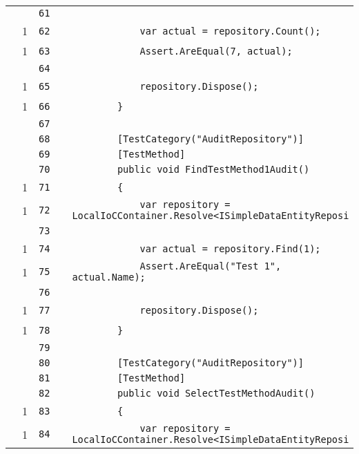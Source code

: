 \documentclass[a4paper,10pt]{article}
\begin{document}
\begin{longtable}[l]{lrrll}
\cellcolor{gray} &  & \verb~61~ & & \verb~~\\
\cellcolor{green} & 1 & \verb~62~ & & \verb~            var actual = repository.Count();~\\
\cellcolor{green} & 1 & \verb~63~ & & \verb~            Assert.AreEqual(7, actual);~\\
\cellcolor{gray} &  & \verb~64~ & & \verb~~\\
\cellcolor{green} & 1 & \verb~65~ & & \verb~            repository.Dispose();~\\
\cellcolor{green} & 1 & \verb~66~ & & \verb~        }~\\
\cellcolor{gray} &  & \verb~67~ & & \verb~~\\
\cellcolor{gray} &  & \verb~68~ & & \verb~        [TestCategory("AuditRepository")]~\\
\cellcolor{gray} &  & \verb~69~ & & \verb~        [TestMethod]~\\
\cellcolor{gray} &  & \verb~70~ & & \verb~        public void FindTestMethod1Audit()~\\
\cellcolor{green} & 1 & \verb~71~ & & \verb~        {~\\
\cellcolor{green} & 1 & \verb~72~ & & \verb~            var repository = LocalIoCContainer.Resolve<ISimpleDataEntityReposi~\\
\cellcolor{gray} &  & \verb~73~ & & \verb~~\\
\cellcolor{green} & 1 & \verb~74~ & & \verb~            var actual = repository.Find(1);~\\
\cellcolor{green} & 1 & \verb~75~ & & \verb~            Assert.AreEqual("Test 1", actual.Name);~\\
\cellcolor{gray} &  & \verb~76~ & & \verb~~\\
\cellcolor{green} & 1 & \verb~77~ & & \verb~            repository.Dispose();~\\
\cellcolor{green} & 1 & \verb~78~ & & \verb~        }~\\
\cellcolor{gray} &  & \verb~79~ & & \verb~~\\
\cellcolor{gray} &  & \verb~80~ & & \verb~        [TestCategory("AuditRepository")]~\\
\cellcolor{gray} &  & \verb~81~ & & \verb~        [TestMethod]~\\
\cellcolor{gray} &  & \verb~82~ & & \verb~        public void SelectTestMethodAudit()~\\
\cellcolor{green} & 1 & \verb~83~ & & \verb~        {~\\
\cellcolor{green} & 1 & \verb~84~ & & \verb~            var repository = LocalIoCContainer.Resolve<ISimpleDataEntityReposi~\\

\end{longtable}
\end{document}
